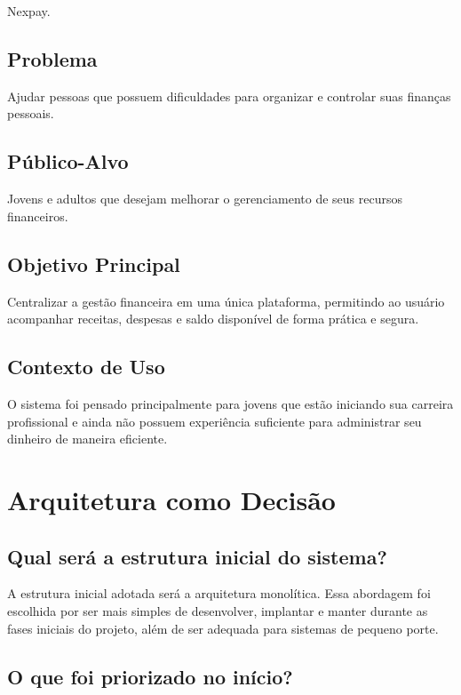 \documentclass{article}
\begin{document}
Nexpay.

\subsection{Problema}

Ajudar pessoas que possuem dificuldades para organizar e controlar suas finanças pessoais.

\subsection{Público-Alvo}

Jovens e adultos que desejam melhorar o gerenciamento de seus recursos financeiros.

\subsection{Objetivo Principal}

Centralizar a gestão financeira em uma única plataforma, permitindo ao usuário acompanhar receitas, despesas e saldo disponível de forma prática e segura.

\subsection{Contexto de Uso}

O sistema foi pensado principalmente para jovens que estão iniciando sua carreira profissional e ainda não possuem experiência suficiente para administrar seu dinheiro de maneira eficiente.

\section{Arquitetura como Decisão}

\subsection{Qual será a estrutura inicial do sistema?}

A estrutura inicial adotada será a arquitetura monolítica. Essa abordagem foi escolhida por ser mais simples de desenvolver, implantar e manter durante as fases iniciais do projeto, além de ser adequada para sistemas de pequeno porte.


\subsection{O que foi priorizado no início?}
\end{document}
